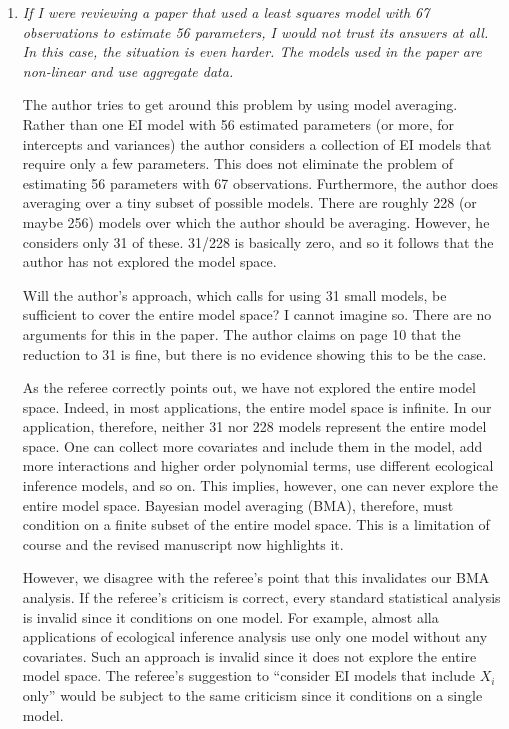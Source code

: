 \documentclass[11pt]{article}
\begin{document}
\begin{enumerate}
\item {\it If I were reviewing a paper that used a least squares model
    with 67 observations to estimate 56 parameters, I would not trust
    its answers at all.  In this case, the situation is even harder.
    The models used in the paper are non-linear and use aggregate
    data.
    
    The author tries to get around this problem by using model
    averaging.  Rather than one EI model with 56 estimated parameters
    (or more, for intercepts and variances) the author considers a
    collection of EI models that require only a few parameters.  This
    does not eliminate the problem of estimating 56 parameters with 67
    observations.  Furthermore, the author does averaging over a tiny
    subset of possible models.  There are roughly 228 (or maybe 256)
    models over which the author should be averaging.  However, he
    considers only 31 of these.  31/228 is basically zero, and so it
    follows that the author has not explored the model space. 
    
    Will the author's approach, which calls for using 31 small models,
    be sufficient to cover the entire model space?  I cannot imagine
    so.  There are no arguments for this in the paper.  The author
    claims on page 10 that the reduction to 31 is fine, but there is
    no evidence showing this to be the case.}
  
  As the referee correctly points out, we have not explored the entire
  model space. Indeed, in most applications, the entire model space is
  infinite. In our application, therefore, neither 31 nor 228 models
  represent the entire model space.  One can collect more covariates
  and include them in the model, add more interactions and higher
  order polynomial terms, use different ecological inference models,
  and so on.  This implies, however, one can never explore the entire
  model space.  Bayesian model averaging (BMA), therefore, must
  condition on a finite subset of the entire model space.  This is a
  limitation of course and the revised manuscript now highlights it.
  
  However, we disagree with the referee's point that this invalidates
  our BMA analysis. If the referee's criticism is correct, every
  standard statistical analysis is invalid since it conditions on one
  model.  For example, almost alla applications of ecological
  inference analysis use only one model without any covariates. Such
  an approach is invalid since it does not explore the entire model
  space.  The referee's suggestion to ``consider EI models that
  include $X_i$ only'' would be subject to the same criticism since it
  conditions on a single model.
  

\end{enumerate}
\end{document}
